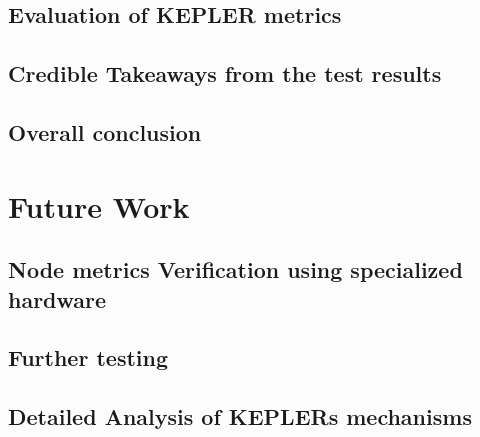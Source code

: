 \subsection{Evaluation of KEPLER metrics}

\subsection{Credible Takeaways from the test results}

\subsection{Overall conclusion}

\section{Future Work}

\subsection{Node metrics Verification using specialized hardware}

\subsection{Further testing}

\subsection{Detailed Analysis of KEPLERs mechanisms}





    


